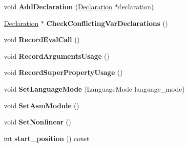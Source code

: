 \begin{DoxyCompactItemize}
\item 
void {\bfseries Add\+Declaration} (\hyperlink{classv8_1_1internal_1_1_declaration}{Declaration} $\ast$declaration)\hypertarget{classv8_1_1internal_1_1_scope_ae8c84baddb09eb2f7947182489cabd45}{}\label{classv8_1_1internal_1_1_scope_ae8c84baddb09eb2f7947182489cabd45}

\item 
\hyperlink{classv8_1_1internal_1_1_declaration}{Declaration} $\ast$ {\bfseries Check\+Conflicting\+Var\+Declarations} ()\hypertarget{classv8_1_1internal_1_1_scope_aca4da0b20082a008449bde02757d6358}{}\label{classv8_1_1internal_1_1_scope_aca4da0b20082a008449bde02757d6358}

\item 
void {\bfseries Record\+Eval\+Call} ()\hypertarget{classv8_1_1internal_1_1_scope_abb725bce049d5b79020961a7d01154d7}{}\label{classv8_1_1internal_1_1_scope_abb725bce049d5b79020961a7d01154d7}

\item 
void {\bfseries Record\+Arguments\+Usage} ()\hypertarget{classv8_1_1internal_1_1_scope_adab94d9a70ee536f33878e0b8df647a7}{}\label{classv8_1_1internal_1_1_scope_adab94d9a70ee536f33878e0b8df647a7}

\item 
void {\bfseries Record\+Super\+Property\+Usage} ()\hypertarget{classv8_1_1internal_1_1_scope_a4b826f8d7858044e4dc865a2941aee54}{}\label{classv8_1_1internal_1_1_scope_a4b826f8d7858044e4dc865a2941aee54}

\item 
void {\bfseries Set\+Language\+Mode} (Language\+Mode language\+\_\+mode)\hypertarget{classv8_1_1internal_1_1_scope_a078880d1ac4f07135782b33d237413c0}{}\label{classv8_1_1internal_1_1_scope_a078880d1ac4f07135782b33d237413c0}

\item 
void {\bfseries Set\+Asm\+Module} ()\hypertarget{classv8_1_1internal_1_1_scope_adfd801a650d124005f5ce9c0d54de4db}{}\label{classv8_1_1internal_1_1_scope_adfd801a650d124005f5ce9c0d54de4db}

\item 
void {\bfseries Set\+Nonlinear} ()\hypertarget{classv8_1_1internal_1_1_scope_adcbad64c7a7c586ac7fdeb8c3231fef7}{}\label{classv8_1_1internal_1_1_scope_adcbad64c7a7c586ac7fdeb8c3231fef7}

\item 
int {\bfseries start\+\_\+position} () const \hypertarget{classv8_1_1internal_1_1_scope_af78d3db495c9278ab8539571eefc7a96}{}\label{classv8_1_1internal_1_1_scope_af78d3db495c9278ab8539571eefc7a96}


\end{DoxyCompactItemize}
